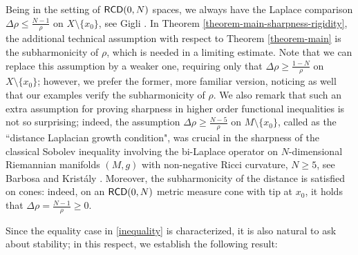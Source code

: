 \documentclass[11pt, reqno]{amsart}
\numberwithin{equation}{section}
\begin{document}
	Being in the setting of ${\sf RCD}(0,N)$ spaces, we always have the Laplace comparison  $\Delta \rho \leq \frac{N-1}{\rho}$ on $X\setminus \{x_0\}$, see  Gigli \cite{Gigli1}. 
	In Theorem \ref{theorem-main-sharpness-rigidity}, the additional technical assumption with respect to Theorem \ref{theorem-main}  is the subharmonicity of $\rho$, which is needed in a limiting estimate. Note that we can replace this assumption by a weaker one, requiring only that  $\Delta \rho \geq \frac{1-N}{\rho}$ on $X\setminus \{x_0\}$; however, we prefer the former, more familiar version, noticing as well that our examples verify the  subharmonicity of $\rho$. We also remark that such an extra assumption for proving sharpness in higher order functional inequalities is not so surprising; indeed, the assumption $\Delta \rho \geq \frac{N-5}{\rho}$ on $M\setminus \{x_0\}$, called as the ``distance Laplacian
	growth condition", was crucial in the sharpness of  the classical Sobolev inequality  involving the bi-Laplace operator on $N$-dimensional Riemannian manifolds $(M,g)$ with non-negative Ricci curvature, $N\geq 5$, see Barbosa and Krist\'aly \cite{Barbosa-Kristaly}. Moreover, the subharmonicity of the distance is satisfied on cones: indeed,   on an ${\sf RCD}(0,N)$ metric measure cone with tip at $x_{0}$, it holds that  $\Delta \rho = \frac{N-1}{\rho}\geq 0$.
		
	 Since  the equality case in \eqref{inequality} is characterized, it is also natural to ask about stability; in this respect, we establish the following result:  
	
	
\end{document}
